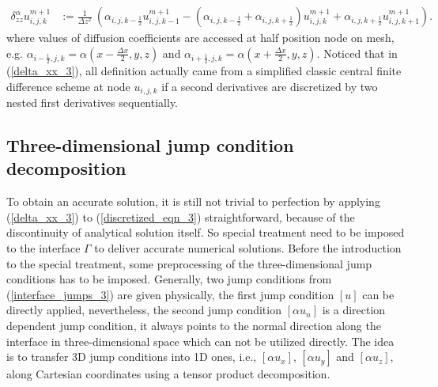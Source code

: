 \documentclass[dissertation]{uathesis}
\begin{document}
\begin{body}
\begin{eqnarray}
\delta_{zz}^{\alpha} u^{m+1}_{i,j,k} &:= 
\frac{1}{\Delta z^{2}} ~ (\alpha_{i,j,k-\frac{1}{2}} u^{m+1}_{i,j,k-1} - (\alpha_{i,j,k-\frac{1}{2}} + \alpha_{i,j,k+\frac{1}{2}}) u^{m+1}_{i,j,k} + \alpha_{i,j,k+\frac{1}{2}} u^{m+1}_{i,j,k+1}).	\nonumber
\end{eqnarray}
%
where values of diffusion coefficients are accessed at half position node on mesh, e.g. $\alpha_{i-\frac{1}{2},j,k}=\alpha (x-\frac{\Delta x}{2},y,z)$ and $\alpha_{i+\frac{1}{2},j,k}=\alpha (x+\frac{\Delta x}{2},y,z)$. Noticed that in (\ref{delta_xx_3}),  all definition actually came from a simplified classic central finite difference scheme at node $u_{i,j,k}$ if a second derivatives are discretized by two nested first derivatives sequentially. 

\subsection{Three-dimensional jump condition decomposition}
To obtain an accurate solution, it is still not trivial to perfection by applying (\ref{delta_xx_3}) to (\ref{discretized_eqn_3}) straightforward, because of the discontinuity of analytical solution itself. So special treatment need to be imposed to the interface $\Gamma$ to deliver accurate numerical solutions. Before the introduction to the special treatment, some preprocessing of the three-dimensional jump conditions has to be imposed. Generally, two jump conditions from (\ref{interface_jumps_3}) are given physically, the first jump condition $[u]$ can be directly applied, nevertheless, the second jump condition $[\alpha u_n]$ is a direction dependent jump condition, it always points to the normal direction along the interface in three-dimensional space which can not be utilized directly. The idea is to transfer 3D jump conditions into 1D ones, i.e., $[\alpha u_{x}]$, $[\alpha u_{y}]$ and $[\alpha u_{z}]$, along Cartesian coordinates using a tensor product decomposition.


\end{body}
\end{document}
